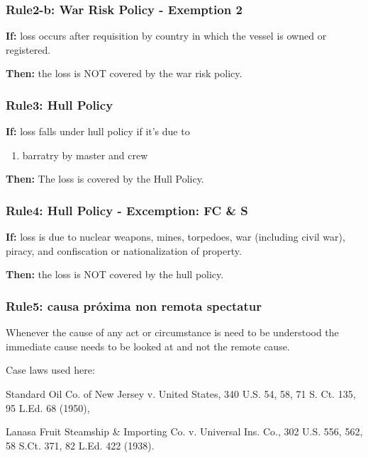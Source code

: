 \subsubsection{Rule2-b: War Risk Policy - Exemption 2}

    \textbf{If:} loss occurs after requisition by country in which the vessel is owned or registered.
    
    \textbf{Then:} the loss is NOT covered by the war risk policy.
    
\subsubsection{Rule3: Hull Policy}

    
    \textbf{If:} loss falls under hull policy if it's due to
    \begin{enumerate}
        \item barratry by master and crew
    \end{enumerate}
    
    \textbf{Then:} The loss is covered by the Hull Policy.

\subsubsection{ Rule4: Hull Policy - Excemption: FC \& S}

    
    \textbf{If:} loss is due to nuclear weapons, mines, torpedoes, war (including civil war), piracy, and confiscation or nationalization of property.
    
    \textbf{Then:} the loss is NOT covered by the hull policy.


\subsubsection{Rule5: causa próxima non remota spectatur}

Whenever the cause of any act or circumstance is need to be understood the immediate cause needs to be looked at and not the remote cause.

Case laws used here:

Standard Oil Co. of New Jersey v. United States, 340 U.S. 54, 58, 71 S. Ct. 135, 95 L.Ed. 68 (1950),

Lanasa Fruit Steamship \& Importing Co. v. Universal Ins. Co., 302 U.S. 556, 562, 58 S.Ct. 371, 82 L.Ed. 422 (1938).

